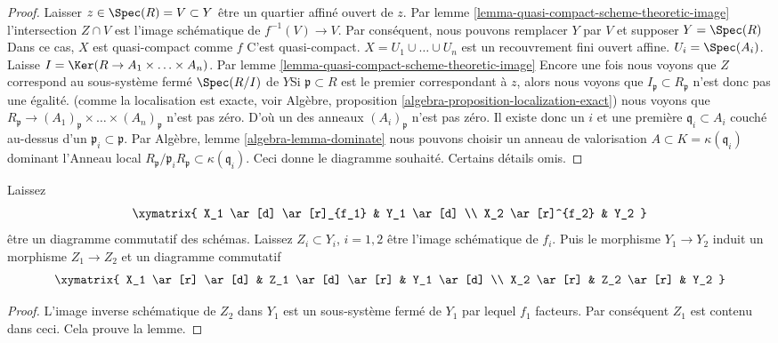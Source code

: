 \begin{proof}

Laisser $z \in \Spec(R) = V \subset Y$ être un quartier affiné ouvert de $z$. Par lemme \ref{lemma-quasi-compact-scheme-theoretic-image}
l'intersection $Z \cap V$ est l'image schématique de
$f^{-1}(V) \to V$. Par conséquent, nous pouvons remplacer $Y$ par $V$
et supposer $Y = \Spec(R)$ Dans ce cas, $X$ est quasi-compact comme $f$ C'est quasi-compact. $X = U_1 \cup \ldots \cup U_n$
est un recouvrement fini ouvert affine. $U_i = \Spec(A_i)$. Laisse $I = \Ker(R \to A_1 \times \ldots \times A_n)$. Par lemme \ref{lemma-quasi-compact-scheme-theoretic-image}
Encore une fois nous voyons que $Z$ correspond au sous-système fermé
$\Spec(R/I)$ de $Y$Si $\mathfrak p \subset R$ est le premier correspondant à $z$, alors nous voyons que
$I_{\mathfrak p} \subset R_{\mathfrak p}$ n'est donc pas une égalité. (comme la localisation est exacte, voir Algèbre, proposition \ref{algebra-proposition-localization-exact}) nous voyons que
$R_{\mathfrak p} \to
(A_1)_{\mathfrak p} \times \ldots \times (A_n)_{\mathfrak p}$
n'est pas zéro. D'où un des anneaux $(A_i)_{\mathfrak p}$ n'est pas zéro. Il existe donc un $i$ et une première $\mathfrak q_i \subset A_i$
couché au-dessus d'un $\mathfrak p_i \subset \mathfrak p$. Par Algèbre, lemme \ref{algebra-lemma-dominate} nous pouvons choisir un anneau de valorisation
$A \subset K = \kappa(\mathfrak q_i)$ dominant l'Anneau local
$R_{\mathfrak p}/\mathfrak p_iR_{\mathfrak p} \subset \kappa(\mathfrak q_i)$. Ceci donne le diagramme souhaité. Certains détails omis.

\end{proof}

\begin{lemma}

\label{lemma-factor-factor}
Laissez $$
\xymatrix{
X_1 \ar[d] \ar[r]_{f_1} & Y_1 \ar[d] \\
X_2 \ar[r]^{f_2} & Y_2
}
$$ être un diagramme commutatif des schémas. Laissez $Z_i \subset Y_i$, $i = 1, 2$ être l'image schématique de $f_i$. Puis le morphisme $Y_1 \to Y_2$ induit un morphisme $Z_1 \to Z_2$ et un diagramme commutatif $$
\xymatrix{
X_1 \ar[r] \ar[d] & Z_1 \ar[d] \ar[r] & Y_1 \ar[d] \\
X_2 \ar[r] & Z_2 \ar[r] & Y_2
}
$$
\end{lemma}

\begin{proof}
L'image inverse schématique de $Z_2$ dans $Y_1$ est un sous-système fermé de $Y_1$ par lequel $f_1$ facteurs. Par conséquent $Z_1$ est contenu dans ceci. Cela prouve la lemme.
\end{proof}

